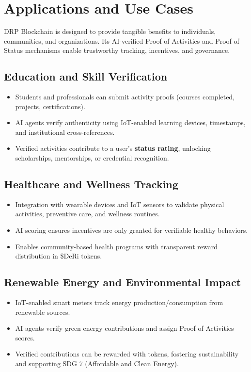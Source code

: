 \documentclass[11pt,a4paper]{article}
\begin{document}
\section{Applications and Use Cases}

DRP Blockchain is designed to provide tangible benefits to individuals, communities, and organizations. Its AI-verified Proof of Activities and Proof of Status mechanisms enable trustworthy tracking, incentives, and governance.  

\subsection{Education and Skill Verification}
\begin{itemize}
    \item Students and professionals can submit activity proofs (courses completed, projects, certifications).  
    \item AI agents verify authenticity using IoT-enabled learning devices, timestamps, and institutional cross-references.  
    \item Verified activities contribute to a user’s \textbf{status rating}, unlocking scholarships, mentorships, or credential recognition.  
\end{itemize}

\subsection{Healthcare and Wellness Tracking}
\begin{itemize}
    \item Integration with wearable devices and IoT sensors to validate physical activities, preventive care, and wellness routines.  
    \item AI scoring ensures incentives are only granted for verifiable healthy behaviors.  
    \item Enables community-based health programs with transparent reward distribution in \$DeRi tokens.  
\end{itemize}

\subsection{Renewable Energy and Environmental Impact}
\begin{itemize}
    \item IoT-enabled smart meters track energy production/consumption from renewable sources.  
    \item AI agents verify green energy contributions and assign Proof of Activities scores.  
    \item Verified contributions can be rewarded with tokens, fostering sustainability and supporting SDG 7 (Affordable and Clean Energy).  
\end{itemize}
\end{document}
